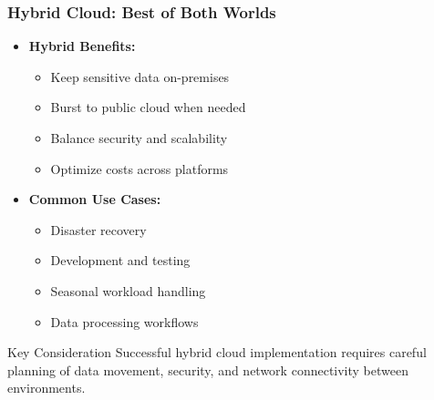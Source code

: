 \documentclass{beamer}
\begin{document}
\begin{frame}
    \frametitle{Hybrid Cloud: Best of Both Worlds}
    
    \begin{itemize}
        \item \textbf{Hybrid Benefits:}
        \begin{itemize}
            \item Keep sensitive data on-premises
            \item Burst to public cloud when needed
            \item Balance security and scalability
            \item Optimize costs across platforms
        \end{itemize}
        
        \item \textbf{Common Use Cases:}
        \begin{itemize}
            \item Disaster recovery
            \item Development and testing
            \item Seasonal workload handling
            \item Data processing workflows
        \end{itemize}
    \end{itemize}
    
    \begin{alertblock}{Key Consideration}
        Successful hybrid cloud implementation requires careful planning of data movement, security, and network connectivity between environments.
    \end{alertblock}
\end{frame}
\end{document}
